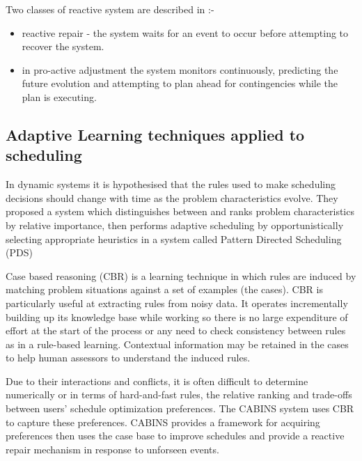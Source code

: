 \documentclass[12pt,a4paper]{article}
\begin{document}
Two classes of reactive system are described in \citep{jones98survey}:-
\begin{itemize}
\item reactive repair - the system waits for an event to occur before attempting to recover the system.
\item in pro-active adjustment the system monitors continuously, predicting the future evolution and attempting to plan ahead for contingencies while the plan is executing.
\end{itemize}

\subsection{Adaptive Learning techniques applied to scheduling}
\label{subsect:adaptive}
In dynamic systems \citep{shaw90intelligent} it is hypothesised that the rules used to make scheduling decisions should change with time as the problem characteristics evolve. They proposed a system which distinguishes between and ranks problem characteristics by relative importance, then performs adaptive scheduling by opportunistically selecting appropriate heuristics in a system called Pattern Directed Scheduling (PDS)

Case based reasoning (CBR) is a learning technique in which rules are induced by matching problem situations against a set of examples (the cases). CBR is particularly useful at extracting rules from noisy data. It operates incrementally building up its knowledge base while working so there is no large expenditure of effort at the start of the process or any need to check consistency between rules as in a rule-based learning. Contextual information may be retained in the cases to help human assessors to understand the induced rules.

Due to their interactions and conflicts, it is often difficult to determine numerically or in terms of hard-and-fast rules, the relative ranking and trade-offs between users' schedule optimization preferences. The CABINS system \citep{miyashita95cabins} uses CBR to capture these preferences. CABINS provides a framework for acquiring preferences then uses the case base to improve schedules and provide a reactive repair mechanism in response to unforseen events. 
\end{document}
